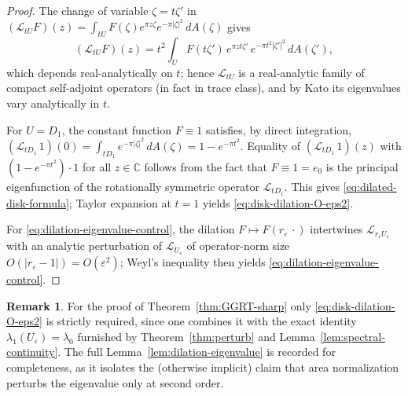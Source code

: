 \documentclass[a4paper,11pt,reqno]{amsart}
\numberwithin{equation}{section}
\theoremstyle{plain} %
\theoremstyle{definition} %
\newtheorem{remark}{Remark}[section]
\theoremstyle{remark}
\newcommand{\C}{\mathbb{C}}
\begin{document}
\begin{proof}
The change of variable \(\zeta=t\zeta'\) in
\((\mathcal L_{tU}F)(z)=\int_{tU}F(\zeta)e^{\pi z\overline\zeta}e^{-\pi|\zeta|^2}\,dA(\zeta)\)
gives
\[
(\mathcal L_{tU}F)(z)
=
t^2\int_U F(t\zeta')\,e^{\pi z t\overline{\zeta'}}\,e^{-\pi t^2|\zeta'|^2}\,dA(\zeta'),
\]
which depends real-analytically on \(t\); hence \(\mathcal L_{tU}\) is a
real-analytic family of compact self-adjoint operators (in fact in trace
class), and by Kato \cite[Ch.~VII]{Kato} its eigenvalues vary analytically
in \(t\).

For \(U=D_1\), the constant function \(F\equiv 1\) satisfies, by direct
integration,
\(
(\mathcal L_{tD_1}\,1)(0)
=
\int_{tD_1}e^{-\pi|\zeta|^2}\,dA(\zeta)
=
1-e^{-\pi t^2}.
\)
Equality of \((\mathcal L_{tD_1}\,1)(z)\) with \((1-e^{-\pi t^2})\cdot 1\) for
all \(z\in\C\) follows from the fact that \(F\equiv 1=e_0\) is the principal
eigenfunction of the rotationally symmetric operator \(\mathcal L_{tD_1}\).
This gives \eqref{eq:dilated-disk-formula}; Taylor expansion at \(t=1\)
yields \eqref{eq:disk-dilation-O-eps2}.

For \eqref{eq:dilation-eigenvalue-control}, the dilation
\(F\mapsto F(r_\varepsilon\,\cdot)\) intertwines \(\mathcal L_{r_\varepsilon
U_\varepsilon}\) with an analytic perturbation of \(\mathcal L_{U_\varepsilon}\)
of operator-norm size \(O(|r_\varepsilon-1|)=O(\varepsilon^2)\); Weyl's
inequality then yields \eqref{eq:dilation-eigenvalue-control}.
\end{proof}

\begin{remark}\label{rem:dilation-explicit}
For the proof of Theorem~\ref{thm:GGRT-sharp} only
\eqref{eq:disk-dilation-O-eps2} is strictly required, since one combines it
with the exact identity \(\lambda_1(U_\varepsilon)=\lambda_0\) furnished by
Theorem~\ref{thm:perturb} and Lemma~\ref{lem:spectral-continuity}. The full
Lemma~\ref{lem:dilation-eigenvalue} is recorded for completeness, as it
isolates the (otherwise implicit) claim that area normalization perturbs
the eigenvalue only at second order.
\end{remark}

\medskip
\end{document}

